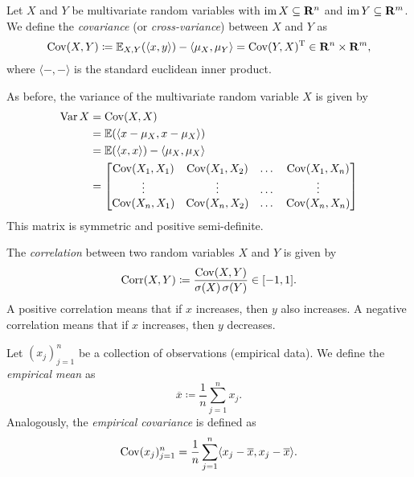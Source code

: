 \begin{definition}
\label{def:covariance-multivariate}
Let \(X\) and \(Y\) be multivariate random variables with \(\operatorname{im} X \subseteq
\mathbf{R}^n\) and \(\operatorname{im} Y \subseteq \mathbf{R}^m\). We define the \emph{covariance} (or \emph{cross-variance}) between
\(X\) and \(Y\) as
\[
\operatorname{Cov}(X, Y) \coloneq \operatorname{\mathbb{E}}_{X, Y}(\langle x, y \rangle) -
\langle \mu_X , \mu_Y  \rangle
= \operatorname{Cov}(Y, X)^{\operatorname{T}} \in \mathbf{R}^n \times \mathbf{R}^m,
\]
where \(\langle -, - \rangle\) is the standard euclidean inner product.

As before, the variance of the multivariate random variable \(X\) is given by
\begin{align*}
  \operatorname{Var} X
  &= \operatorname{Cov}(X, X) \\
  &= \operatorname{\mathbb{E}}(\langle x - \mu_X, x - \mu_X \rangle) \\
  &= \operatorname{\mathbb{E}}(\langle x, x \rangle) - \langle \mu_X, \mu_X \rangle \\
  &=
    \begin{bmatrix}
      \operatorname{Cov}(X_1, X_1) &\operatorname{Cov}(X_1, X_2) &\dots &\operatorname{Cov}(X_1, X_n) \\
      \vdots &\vdots &\dots &\vdots \\
      \operatorname{Cov}(X_n, X_1) &\operatorname{Cov}(X_n, X_2) &\dots &\operatorname{Cov}(X_n, X_n) \\
    \end{bmatrix}
\end{align*}
This matrix is symmetric and positive semi-definite.
\end{definition}

\begin{definition}[Correlation]
\label{def:correlation}
The \emph{correlation} between two random variables \(X\) and \(Y\) is given by
\[
\operatorname{Corr}(X, Y) \coloneq \frac{\operatorname{Cov}(X, Y)}{\operatorname{\sigma}(X) \operatorname{\sigma}(Y)} \in [-1, 1].
\]
A positive correlation means that if \(x\) increases, then \(y\) also
increases. A negative correlation means that if \(x\) increases, then \(y\)
decreases.
\end{definition}

\begin{definition}
\label{def:empirical-mean-and-covariance}
Let \((x_j)_{j=1}^{n}\) be a collection of observations (empirical data). We
define the \emph{empirical mean} as
\[
\overline x \coloneq \frac{1}{n} \sum_{j=1}^n x_j.
\]
Analogously, the \emph{empirical covariance} is defined as
\[
\operatorname{Cov}(x_j)_{j=1}^n
= \frac{1}{n} \sum_{j=1}^n \langle x_j - \overline x, x_j - \overline x \rangle.
\]
\end{definition}

